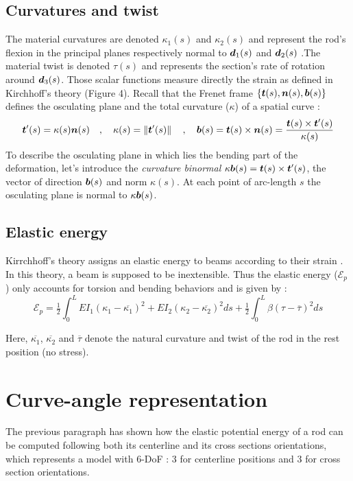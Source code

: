 \subsection{Curvatures and twist}
The material curvatures are denoted $\kappa_1(s)$ and $\kappa_2(s)$ and represent the rod's flexion in the principal planes respectively normal to $\boldsymbol{d}_1(s)$ and $\boldsymbol{d}_2(s)$ .The material twist is denoted $\tau(s)$ and represents the section's rate of rotation around $\boldsymbol{d}_3(s)$. Those scalar functions measure directly the strain as defined in Kirchhoff's theory (Figure 4). Recall that the Frenet frame $\{\boldsymbol{t}(s),\boldsymbol{n}(s),\boldsymbol{b}(s)\}$ defines the osculating plane and the total curvature ($\kappa$) of a spatial curve :
\begin{equation}
	\boldsymbol{t}'(s) = \kappa(s) \boldsymbol{n}(s)
	\quad,\quad
	\kappa(s) = \left\|\boldsymbol{t}'(s)\right\|
	\quad,\quad
	\boldsymbol{b}(s) = \boldsymbol{t}(s) \times \boldsymbol{n}(s) = \frac{\boldsymbol{t}(s) \times \boldsymbol{t}'(s)}{\kappa(s)}
\end{equation}
To describe the osculating plane in which lies the bending part of the deformation, let's introduce the \emph{curvature binormal} $\kappa\boldsymbol{b}(s) = \boldsymbol{t}(s)\times\boldsymbol{t}'(s)$, the vector of direction $\boldsymbol{b}(s)$ and norm $\kappa(s)$. At each point of arc-length $s$ the osculating plane is normal to $\kappa\boldsymbol{b}(s)$.

\subsection{Elastic energy}
Kirrchhoff's theory assigns an elastic energy to beams according to their strain \cite{Audoly2010}. In this theory, a beam is supposed to be inextensible. Thus the elastic energy ($\mathcal{E}_p$) only accounts for torsion and bending behaviors and is given by :
\begin{equation}
	\mathcal{E}_{p} =
	\tfrac{1}{2} \int_{0}^{L}EI_1(\kappa_1-\overbar{\kappa_1})^2 + EI_2(\kappa_2-\overbar{\kappa_2})^2 ds
	+ \tfrac{1}{2} \int_{0}^{L} \beta(\tau -{\overbar{\tau}})^2 ds
\end{equation}

Here, $\overbar{\kappa_1}$, $\overbar{\kappa_2}$ and $\overbar{\tau}$  denote the natural curvature and twist of the rod in the rest position (no stress).

\section{Curve-angle representation}
The previous paragraph has shown how the elastic potential energy of a rod can be computed following both its centerline and its cross sections orientations, which represents a model with 6-DoF : 3 for centerline positions and 3 for cross section orientations.

